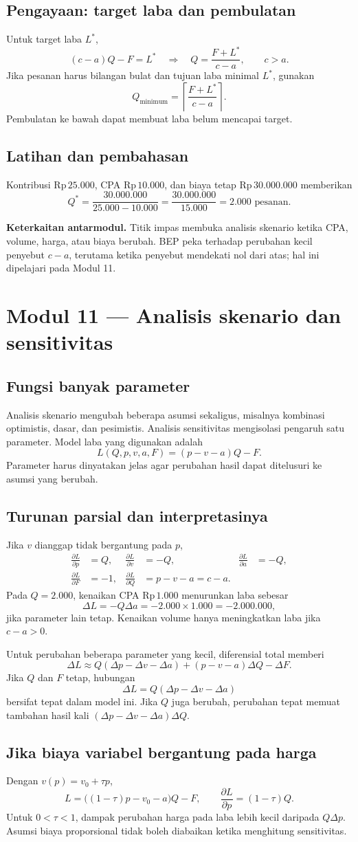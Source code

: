 \documentclass[11pt,a4paper]{article}
\newcommand{\modul}[2]{\clearpage\section{Modul #1 --- #2}}
\newcommand{\bagian}[1]{\Needspace{5\baselineskip}\subsection{#1}}
\newcommand{\jembatan}[1]{\par\textbf{Keterkaitan antarmodul.} #1\par}
\newcommand{\rp}[1]{\ensuremath{\mathrm{Rp}\,#1}}
\begin{document}
\bagian{Pengayaan: target laba dan pembulatan}
Untuk target laba \(L^*\),
\[
(c-a)Q-F=L^*\quad\Longrightarrow\quad
Q=\frac{F+L^*}{c-a},\qquad c>a.
\]
Jika pesanan harus bilangan bulat dan tujuan laba minimal \(L^*\), gunakan
\[
Q_{\text{minimum}}=\left\lceil\frac{F+L^*}{c-a}\right\rceil.
\]
Pembulatan ke bawah dapat membuat laba belum mencapai target.

\bagian{Latihan dan pembahasan}
Kontribusi \rp{25.000}, CPA \rp{10.000}, dan biaya tetap \rp{30.000.000} memberikan
\[
Q^*=\frac{30.000.000}{25.000-10.000}
=\frac{30.000.000}{15.000}=2.000\text{ pesanan}.
\]
\jembatan{Titik impas membuka analisis skenario ketika CPA, volume, harga, atau biaya berubah. BEP peka terhadap perubahan kecil penyebut \(c-a\), terutama ketika penyebut mendekati nol dari atas; hal ini dipelajari pada Modul 11.}

\modul{11}{Analisis skenario dan sensitivitas}
\bagian{Fungsi banyak parameter}
Analisis skenario mengubah beberapa asumsi sekaligus, misalnya kombinasi optimistis, dasar, dan pesimistis. Analisis sensitivitas mengisolasi pengaruh satu parameter. Model laba yang digunakan adalah
\[
L(Q,p,v,a,F)=(p-v-a)Q-F.
\]
Parameter harus dinyatakan jelas agar perubahan hasil dapat ditelusuri ke asumsi yang berubah.

\bagian{Turunan parsial dan interpretasinya}
Jika \(v\) dianggap tidak bergantung pada \(p\),
\[
\begin{aligned}
\frac{\partial L}{\partial p}&=Q,&
\frac{\partial L}{\partial v}&=-Q,&
\frac{\partial L}{\partial a}&=-Q,\\
\frac{\partial L}{\partial F}&=-1,&
\frac{\partial L}{\partial Q}&=p-v-a=c-a.
\end{aligned}
\]
Pada \(Q=2.000\), kenaikan CPA \rp{1.000} menurunkan laba sebesar
\[
\Delta L=-Q\Delta a=-2.000\times1.000=-2.000.000,
\]
jika parameter lain tetap. Kenaikan volume hanya meningkatkan laba jika \(c-a>0\).

Untuk perubahan beberapa parameter yang kecil, diferensial total memberi
\[
\Delta L\approx
Q(\Delta p-\Delta v-\Delta a)+(p-v-a)\Delta Q-\Delta F.
\]
Jika \(Q\) dan \(F\) tetap, hubungan
\[
\Delta L=Q(\Delta p-\Delta v-\Delta a)
\]
bersifat tepat dalam model ini. Jika \(Q\) juga berubah, perubahan tepat memuat tambahan hasil kali
\((\Delta p-\Delta v-\Delta a)\Delta Q\).

\bagian{Jika biaya variabel bergantung pada harga}
Dengan \(v(p)=v_0+\tau p\),
\[
L=\bigl((1-\tau)p-v_0-a\bigr)Q-F,
\qquad \frac{\partial L}{\partial p}=(1-\tau)Q.
\]
Untuk \(0<\tau<1\), dampak perubahan harga pada laba lebih kecil daripada \(Q\Delta p\). Asumsi biaya proporsional tidak boleh diabaikan ketika menghitung sensitivitas.
\end{document}
